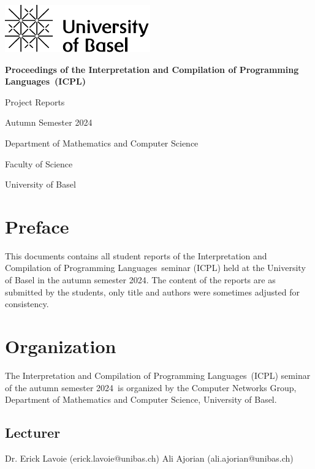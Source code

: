 \documentclass[runningheads,a4paper]{llncs}
\newenvironment{produceProceedings}{}{}
\newcommand{\coursename}{Interpretation and Compilation of Programming Languages}
\newcommand{\courseacronym}{ICPL}
\newcommand{\semester}{autumn semester 2024}
\newcommand{\Semester}{Autumn Semester 2024}
\newcommand{\proceedingsSubtitle}{Project Reports}
\begin{document}
	
\begin{produceProceedings}
	
	\begin{titlepage}
		\includegraphics{UniBas_Logo_EN_Schwarz_RGB_65}
		
		\vspace{80pt}
		
		\centering
		
		\begin{spacing}{2.8}
		{\Huge {} \bfseries Proceedings of the \coursename\ (\courseacronym)}
		\end{spacing}
		
		\vspace{25pt}
		
		{\large \proceedingsSubtitle}
		
		\vspace{50pt}
		
		{\large \Semester}
		
		\vspace{50pt}
		
		{\large	Department of Mathematics and Computer Science}
		
		\vspace{5pt}
		
		{\large Faculty of Science}
		
		\vspace{25pt}
		
		{\large	University of Basel}
	\end{titlepage}
	
	
	\pagestyle{headings}
	\chapter*{Preface}
	This documents contains all student reports of the \coursename\ seminar (\courseacronym) held at the University of Basel in the \semester.
    The content of the reports are as submitted by the students, only title and authors were sometimes adjusted for consistency.
	\chapter*{Organization}
	The \coursename\ (\courseacronym) seminar of the \semester\ is organized by the Computer Networks Group, Department of Mathematics and Computer Science, University of Basel.
	\section*{Lecturer}
    Dr. Erick Lavoie (erick.lavoie@unibas.ch)
    Ali Ajorian (ali.ajorian@unibas.ch)
	\tableofcontents
\end{produceProceedings}
	
%
\mainmatter
%


\end{document}
